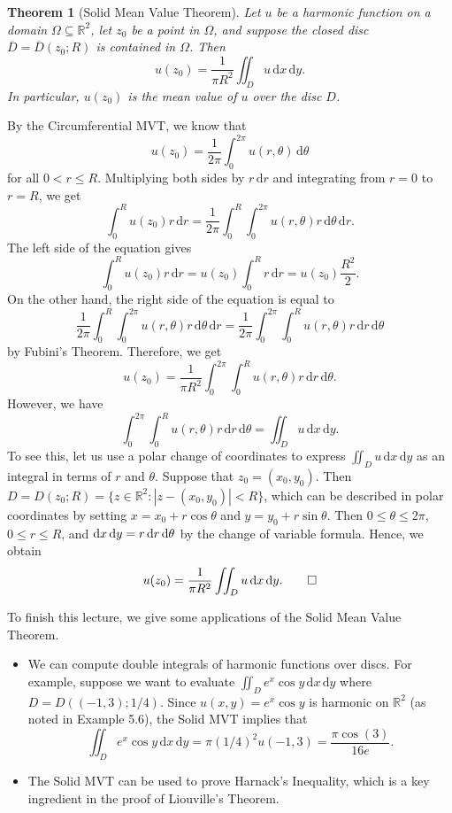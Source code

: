 \documentclass[10pt]{article}
\makeatletter
\newcommand{\R}{\mathbb{R}}
\newcommand{\dd}{\,\mathrm{d}}
\theoremstyle{newstyle}
\newtheorem{thm}{Theorem}[section]
\newenvironment{pf}[1][\proofname]{\par
  \pushQED{\qed}%
  \normalfont \topsep0\p@\relax
  \trivlist
  \item[\hskip\labelsep\scshape
  #1\@addpunct{.}]\ignorespaces
}{%
  \popQED\endtrivlist\@endpefalse
}
\makeatother
\begin{document}
\begin{thm}[Solid Mean Value Theorem]
Let $u$ be a harmonic function on a domain $\Omega \subseteq \R^2$, let $z_0$ be a point 
in $\Omega$, and suppose the closed disc $\overline{D} = \overline{D}(z_0; R)$ is contained in 
$\Omega$. Then 
\[ u(z_0) = \frac{1}{\pi R^2} \iint_D u\dd x \dd y. \]
In particular, $u(z_0)$ is the mean value of $u$ over the disc $D$.
\end{thm}
\begin{pf}
By the Circumferential MVT, we know that 
\[ u(z_0) = \frac{1}{2\pi} \int_0^{2\pi} u(r,\theta)\dd\theta \]
for all $0 < r \leq R$. Multiplying both sides by $r\dd r$ and integrating from $r = 0$ 
to $r = R$, we get 
\[ \int_0^R u(z_0)r \dd r = \frac{1}{2\pi} \int_0^R \int_0^{2\pi} u(r, \theta)r\dd \theta \dd r. \]
The left side of the equation gives 
\[ \int_0^R u(z_0)r \dd r = u(z_0) \int_0^R r\dd r = u(z_0) \frac{R^2}2. \]
On the other hand, the right side of the equation is equal to 
\[ \frac{1}{2\pi} \int_0^R \int_0^{2\pi} u(r, \theta)r \dd \theta \dd r = \frac{1}{2\pi} 
\int_0^{2\pi} \int_0^R u(r, \theta)r \dd r \dd\theta \]
by Fubini's Theorem. Therefore, we get 
\[ u(z_0) = \frac{1}{\pi R^2} \int_0^{2\pi} \int_0^R u(r, \theta)r \dd r \dd\theta. \]
However, we have 
\[ \int_0^{2\pi} \int_0^R u(r, \theta)r \dd r \dd\theta = \iint_D u \dd x \dd y. \]
To see this, let us use a polar change of coordinates to express 
$\iint_D u\dd x \dd y$ as an integral in terms of $r$ and $\theta$. Suppose that 
$z_0 = (x_0, y_0)$. Then $D = D(z_0; R) = \{z \in \R^2 : |z - (x_0, y_0)| < R\}$, which 
can be described in polar coordinates by setting $x = x_0 + r\cos\theta$ and 
$y = y_0 + r\sin\theta$. Then $0 \leq \theta \leq 2\pi$, $0 \leq r \leq R$, and 
${\rm d}x \dd y = r\dd r \dd\theta$ by the change of variable formula. Hence, we obtain 
\[ u(z_0) = \frac{1}{\pi R^2} \iint_D u\dd x \dd y. \qedhere \]
\end{pf}

To finish this lecture, we give some applications of the Solid Mean Value Theorem.
\begin{itemize}
    \item We can compute double integrals of harmonic functions over discs. 
    For example, suppose we want to evaluate $\iint_D e^x\cos y \dd x \dd y$ where 
    $D = D((-1, 3); 1/4)$. Since $u(x, y) = e^x \cos y$ is harmonic on $\R^2$ 
    (as noted in Example 5.6), the Solid MVT implies that 
    \[ \iint_D e^x \cos y \dd x \dd y = \pi(1/4)^2 u(-1, 3) = \frac{\pi \cos(3)}{16e}. \]
    \item The Solid MVT can be used to prove Harnack's Inequality, which is a key 
    ingredient in the proof of Liouville's Theorem.
\end{itemize}
\end{document}
